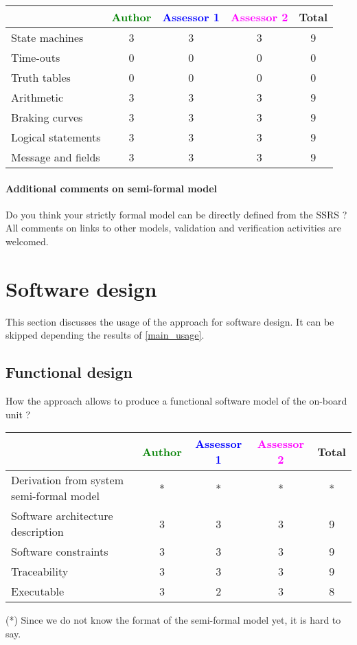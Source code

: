 \begin{tabular}{|l | c | c | c | c|}
\hline
& \textcolor{green}{Author} & \textcolor{blue}{Assessor 1} & \textcolor{magenta}{Assessor 2} & Total \\
\hline 
State machines  &3 &3 & 3 & 9 \\
\hline
Time-outs  &0 &0 & 0& 0 \\
\hline
Truth tables  &0 &0 & 0& 0 \\
\hline
Arithmetic  &3 &3 & 3& 9 \\
\hline
Braking curves  &3 &3 & 3& 9 \\
\hline
Logical statements &3 &3 & 3& 9 \\
\hline
Message and fields &3 &3 & 3& 9 \\
\hline
\end{tabular}

\paragraph{Additional comments on semi-formal  model} Do you think your strictly formal  model can be directly defined from the SSRS ?
All comments on links to  other models, validation and verification activities are welcomed.


\section{Software design}
This section discusses the usage of the approach for software design.
It can be skipped depending the results of \ref{main_usage}.

\subsection{Functional design}

How the approach allows to  produce a functional software model of the on-board unit ?

\begin{tabular}{|l | c | c | c | c|}
\hline
& \textcolor{green}{Author} & \textcolor{blue}{Assessor 1} & \textcolor{magenta}{Assessor 2} & Total \\
\hline
Derivation from system semi-formal model  &* &* & *& * \\
\hline 
Software architecture description  &3 &3 & 3& 9 \\
\hline
Software constraints  &3 &3 & 3& 9 \\
\hline
Traceability  &3 &3 & 3& 9 \\
\hline
Executable  &3 &2 & 3& 8 \\
\hline
\end{tabular}
\begin{author_comment}
(*) Since we do not know the format of the semi-formal model  yet, it is hard to say.
\end{author_comment}

